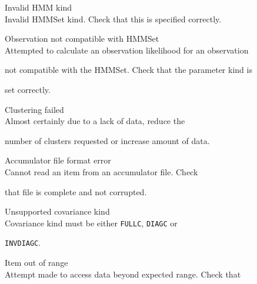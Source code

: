 \begin{itemize}
\begin{itemize}
    Invalid HMM kind\\


        Invalid HMMSet kind.  Check that this is specified correctly.





    Observation not compatible with HMMSet\\


        Attempted to calculate an observation likelihood for an observation


        not compatible with the HMMSet.  Check that the parameter kind is


        set correctly.





\end{itemize}










\begin{itemize}


    Clustering failed\\


        Almost certainly due to a lack of data, reduce the


        number of clusters requested  or increase amount of data.





    Accumulator file format error\\


        Cannot read an item from an accumulator file. Check


        that file is complete and not corrupted.





    Unsupported covariance kind\\


        Covariance kind must be either \texttt{FULLC}, \texttt{DIAGC} or 


        \texttt{INVDIAGC}.





    Item out of range\\


        Attempt made to access data beyond expected range. Check that 



\end{itemize}
\end{itemize}
